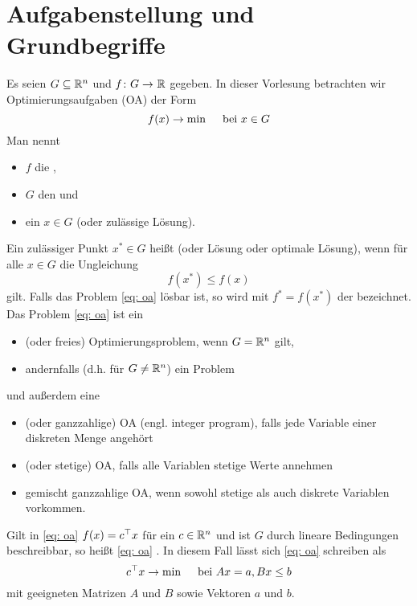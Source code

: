 \section{Aufgabenstellung und Grundbegriffe}

Es seien $G \subseteq \mathbb{R}^n$ und $\abb{f}{G}{\R}$ gegeben. In dieser Vorlesung betrachten wir Optimierungsaufgaben (OA) der Form
\begin{equation}\label{eq: oa}
	f(x) \to \min \quad \text{ bei } x \in G
\end{equation}
Man nennt
\begin{itemize}[nolistsep, topsep=-\parskip]
	\item $f$ die ,
	\item $G$ den  und
	\item ein $x \in  G$  (oder zulässige Lösung).
\end{itemize} 
\vspace{\parskip}

Ein zulässiger Punkt $x^\ast \in G$ heißt  (oder Lösung oder optimale Lösung), wenn für alle $x \in G$ die Ungleichung
\begin{equation} \label{eq: 1.2}
	f(x^\ast) \le f(x)
\end{equation}
gilt. Falls das Problem \eqref{eq: oa} lösbar ist, so wird mit $f^\ast = f(x^\ast)$ der  bezeichnet. Das Problem \eqref{eq: oa} ist ein
\begin{itemize}[nolistsep, topsep=-\parskip]
	\item {} (oder freies) Optimierungsproblem, wenn $G = \mathbb{R}^n$ gilt,
	\item andernfalls (d.h. für $G \neq \mathbb{R}^n$) ein  Problem
\end{itemize}
und außerdem eine
\begin{itemize}[nolistsep, topsep=-\parskip]
	\item {} (oder ganzzahlige) OA (engl. integer program), falls jede Variable einer diskreten Menge angehört
	\item {} (oder stetige) OA, falls alle Variablen stetige Werte annehmen
	\item gemischt ganzzahlige OA, wenn sowohl stetige als auch diskrete Variablen vorkommen.
\end{itemize} 
\vspace{\parskip}

Gilt in \eqref{eq: oa} $f(x) = c^{\top} x$ für ein $c \in \mathbb{R}^n$ und ist $G$ durch lineare Bedingungen beschreibbar, so heißt \eqref{eq: oa} . In diesem Fall lässt sich \eqref{eq: oa} schreiben als
\begin{equation} \label{eq: 1_3_lineareOA}
	c^{\top} x \to \min \quad \text{ bei } Ax = a, Bx \le b
\end{equation}
mit geeigneten Matrizen $A$ und $B$ sowie Vektoren $a$ und $b$.

